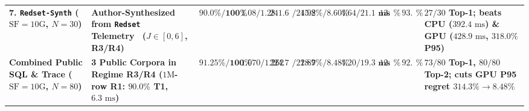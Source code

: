 \documentclass[10pt,a4paper]{article}
\newenvironment{fitasttable}{%
  \begin{lrbox}{\asttblbox}%
}{%
  \end{lrbox}%
  \sbox{\asttblboxB}{%
    \ifdim\wd\asttblbox>0.96\textwidth
      \resizebox{0.96\textwidth}{!}{\usebox{\asttblbox}}%
    \else
      \usebox{\asttblbox}%
    \fi
  }%
  \ifdim\ht\asttblboxB>0.72\textheight
    \resizebox{!}{0.72\textheight}{\usebox{\asttblboxB}}%
  \else
    \usebox{\asttblboxB}%
  \fi
}
\begin{document}
\begin{table}[!htbp]
\begin{fitasttable}
\begin{tabular}{@{}llcccccccl@{}}
\textbf{7. \texttt{Redset-Synth} ($\text{SF}=10\text{G}$, $N=30$)} & \textbf{Author-Synthesized from \texttt{Redset} Telemetry~\cite{vanrenen2024redset} ($J\in[0,6]$, R3/R4)} & $\mathbf{90.0\% / 100\%}$ & $\mathbf{1.08 / 1.28}$ & $\mathbf{241.65 / 245.80}$ & $\mathbf{1.92\% / 8.60\%}$ & $\mathbf{4.64 / 21.1\text{ ms}}$ & $13.3\%$ & $\mathbf{93.3\%}$ & \textbf{$27/30$ Top-1; beats CPU ($392.4\text{ ms}$) \& GPU ($428.9\text{ ms}$, $318.0\%$ P95)} \\
\textbf{Combined Public SQL \& Trace ($\text{SF}=10\text{G}$, $N=80$)} & \textbf{3 Public Corpora in Regime R3/R4 ($1\text{M}$-row R1: $90.0\%$ T1, $6.3\text{ ms}$)} & $\mathbf{91.25\% / 100\%}$ & $\mathbf{1.070 / 1.262}$ & $\mathbf{224.76 / 228.91}$ & $\mathbf{1.87\% / 8.48\%}$ & $\mathbf{4.20 / 19.3\text{ ms}}$ & $\mathbf{12.5\%}$ & $\mathbf{92.5\%}$ & \textbf{$73/80$ Top-1, $80/80$ Top-2; cuts GPU P95 regret $314.3\%\rightarrow 8.48\%$} \\
\bottomrule
\end{tabular}
\end{fitasttable}%
\end{table}
\end{document}
